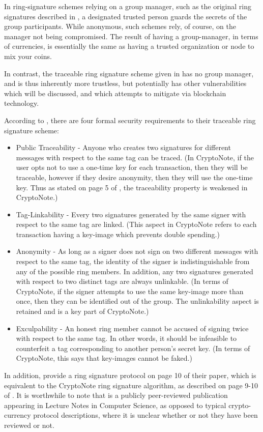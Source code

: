 \documentclass[12pt,english]{mrl}
\numberwithin{equation}{section}
\numberwithin{figure}{section}
\begin{document}
In ring-signature schemes relying on a group manager, such as the
original ring signatures described in \cite{CH}, a designated trusted
person guards the secrets of the group participants. While anonymous,
such schemes rely, of course, on the manager not being compromised.
The result of having a group-manager, in terms of currencies, is essentially
the same as having a trusted organization or node to mix your coins.

In contrast, the traceable ring signature scheme given in \cite{FS}
has no group manager, and is thus inherently more trustless, but potentially
has other vulnerabilities which will be discussed, and which \cite{CN}
attempts to mitigate via blockchain technology. 

According to \cite{FS}, there are four formal security requirements
to their traceable ring signature scheme:
\begin{itemize}
\item Public Traceability - Anyone who creates two signatures for different
messages with respect to the same tag can be traced. (In CryptoNote,
if the user opts not to use a one-time key for each transaction, then
they will be traceable, however if they desire anonymity, then they
will use the one-time key. Thus as stated on page 5 of \cite{CN},
the traceability property is weakened in CryptoNote.) 
\item Tag-Linkability - Every two signatures generated by the same signer
with respect to the same tag are linked. (This aspect in CryptoNote
refers to each transaction having a key-image which
prevents double spending.) %


\item Anonymity - As long as a signer does not sign on two different messages
with respect to the same tag, the identity of the signer is indistinguishable
from any of the possible ring members. In addition, any two signatures
generated with respect to two distinct tags are always unlinkable.
(In terms of CryptoNote, if the signer attempts to use the same key-image
more than once, then they can be identified out of the group. The
unlinkability aspect is retained and is a key part of CryptoNote.)
\item Exculpability - An honest ring member cannot be accused of signing
twice with respect to the same tag. In other words, it should be infeasible
to counterfeit a tag corresponding to another person's secret key.
(In terms of CryptoNote, this says that key-images cannot be faked.)
\end{itemize}
In addition, \cite{FS} provide a ring signature protocol on page
10 of their paper, which is equivalent to the CryptoNote ring signature
algorithm, as described on page 9-10 of \cite{CN}. It is worthwhile
to note that \cite{FS} is a publicly peer-reviewed publication appearing
in Lecture Notes in Computer Science, as opposed to typical crypto-currency
protocol descriptions, where it is  unclear whether or not they have been reviewed or not. 
\end{document}
